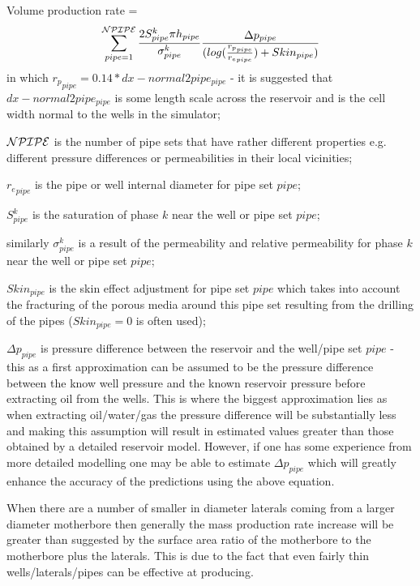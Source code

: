 Volume production rate =
\begin{equation}
\sum\limits_{{pipe}=1}^{{\cal NPIPE}}
\frac{2 S_{pipe}^k \pi {h}_{pipe} }{\sigma_{pipe}^k } \frac{\Delta p_{pipe}}{ ( log(\frac{ {r_p}_{pipe} }{ {r_e}_{pipe} }) + {Skin}_{pipe})}
\end{equation}
in which ${r_p}_{pipe} = 0.14 * dx-normal2pipe_{pipe}$ - it is suggested that $dx-normal2pipe_{pipe}$
is some length scale across the reservoir and is the cell width normal to the wells in the simulator;
\par\noindent
${\cal NPIPE}$ is the number of pipe sets that have rather different properties e.g. different
pressure differences or permeabilities in their local vicinities;
\par\noindent
${r_e}_{pipe}$ is the pipe or well internal diameter for pipe set $pipe$;
\par\noindent
$S_{pipe}^k $ is the saturation of phase $k$ near the well or pipe set $pipe$;
\par\noindent
similarly $\sigma_{pipe}^k$ is a result of the permeability and relative permeability for
phase $k$  near the well or pipe set $pipe$;
\par\noindent
 ${Skin}_{pipe}$ is the skin effect adjustment for pipe set $pipe$ which takes into account
the fracturing of the porous media around this pipe set resulting from the drilling of the pipes
(${Skin}_{pipe}=0$ is
often used);
\par\noindent
$\Delta p_{pipe}$ is pressure difference between the reservoir and the well/pipe set $pipe$ - this
as a first approximation can be assumed to be the pressure difference between the know well pressure
and the known reservoir pressure before extracting oil from the wells. This is where the biggest
approximation lies as when extracting oil/water/gas the pressure difference will be substantially less
and making this assumption will result in estimated values
greater than those obtained by a detailed reservoir model. However, if one has some experience from
more detailed modelling one may be able to estimate $\Delta p_{pipe}$ which will greatly enhance the accuracy of the
predictions using the above equation.

When there are a number of smaller in diameter laterals coming from a larger diameter motherbore
then generally the mass production rate increase will be greater than suggested by the surface area ratio
of the motherbore to the motherbore plus the laterals.    This is due to the fact that even fairly thin
wells/laterals/pipes can be effective at producing.





